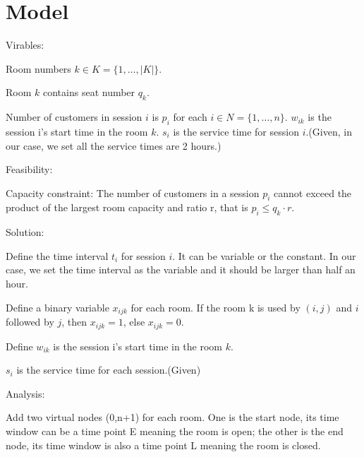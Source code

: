 \section{Model}


Virables:

Room numbers $k \in K = \{1,\ldots,|K|\}$. 

Room $k$ contains seat number $q_k$. 

Number of customers in session $i$ is $p_i$ for each $i \in N = \{1,\ldots,n\}$. $w_{ik}$ is the session i's start time in the room $k$. $s_i$ is the service time for session $i$.(Given, in our case, we set all the service times are 2 hours.)

Feasibility:


Capacity constraint:
The number of customers in a session $p_i$ cannot exceed the product of the largest room capacity and ratio r, that is $p_i \leq q_k\cdot r$.

Solution:

Define the time interval $t_{i}$ for session $i$. It can be variable or the constant. In our case, we set the time interval as the variable and it should be larger than half an hour.

Define a binary variable $x_{ijk}$ for each room. If the room k is used by $(i,j)$ and $i$ followed by $j$, then $x_{ijk} = 1$, else $x_{ijk} = 0$.

Define
$w_{ik}$ is the session i's start time in the room $k$.

$s_i$ is the service time for each session.(Given)


Analysis:

Add two virtual nodes (0,n+1) for each room. One is the start node, its time window can be a time point E meaning the room is open; the other is the end node, its time window is also a time point L meaning the room is closed.

